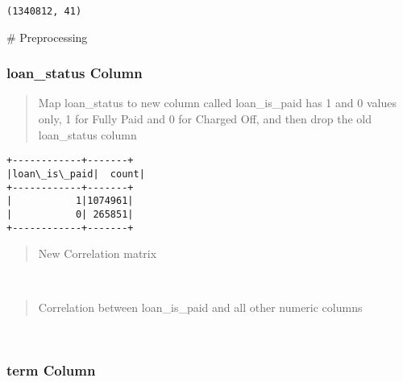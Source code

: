 \documentclass[11pt]{article}
\begin{document}
    \begin{Verbatim}[commandchars=\\\{\}]
(1340812, 41)
    \end{Verbatim}

    \# Preprocessing

    \hypertarget{loan_status-column}{%
\subsubsection{loan\_status Column}\label{loan_status-column}}

    \begin{quote}
Map loan\_status to new column called loan\_is\_paid has 1 and 0 values
only, 1 for Fully Paid and 0 for Charged Off, and then drop the old
loan\_status column
\end{quote}

    \begin{Verbatim}[commandchars=\\\{\}]
+------------+-------+
|loan\_is\_paid|  count|
+------------+-------+
|           1|1074961|
|           0| 265851|
+------------+-------+

    \end{Verbatim}

    \begin{quote}
New Correlation matrix
\end{quote}

    \begin{center}
    \end{center}
    { \hspace*{\fill} \\}
    
    \begin{quote}
Correlation between loan\_is\_paid and all other numeric columns
\end{quote}

    \begin{center}
    \end{center}
    { \hspace*{\fill} \\}
    
    \hypertarget{term-column}{%
\subsubsection{term Column}\label{term-column}}
\end{document}
